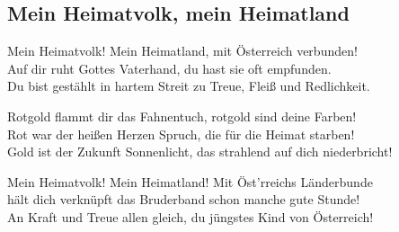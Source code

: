 
\subsection*{Mein Heimatvolk, mein Heimatland}
%
%

\thestrophe Mein Heimatvolk! Mein Heimatland, mit Österreich verbunden! \\
Auf dir ruht Gottes Vaterhand, du hast sie oft empfunden. \\
Du bist gestählt in hartem Streit zu Treue, Fleiß und Redlichkeit. \\

\thestrophe Rotgold flammt dir das Fahnentuch, rotgold sind deine Farben! \\
Rot war der heißen Herzen Spruch, die für die Heimat starben! \\
Gold ist der Zukunft Sonnenlicht, das strahlend auf dich niederbricht! \\

\thestrophe Mein Heimatvolk! Mein Heimatland! Mit Öst'rreichs Länderbunde \\
hält dich verknüpft das Bruderband schon manche gute Stunde! \\
An Kraft und Treue allen gleich, du jüngstes Kind von Österreich! \\
